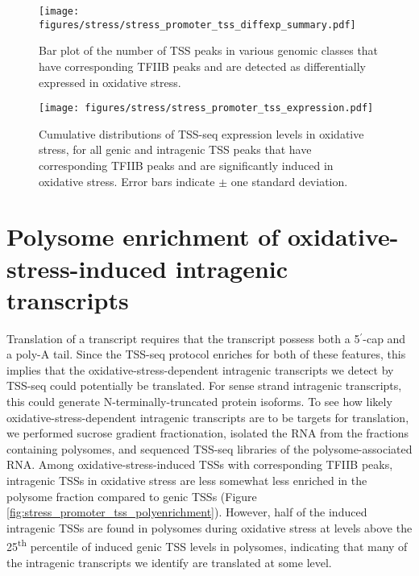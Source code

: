 \begin{SCfigure}[50][h]
    \texttt{[image: figures/stress/stress\_promoter\_tss\_diffexp\_summary.pdf]}
    \caption[Bar plot of the number of promoters in various genomic classes detected as differentially expressed in oxidative stress.]{Bar plot of the number of TSS peaks in various genomic classes that have corresponding TFIIB peaks and are detected as differentially expressed in oxidative stress.}
    \label{fig:stress_promoter_tss_diffexp_summary}
\end{SCfigure}

\begin{figure}[h]
    \texttt{[image: figures/stress/stress\_promoter\_tss\_expression.pdf]}
    \caption[TSS-seq expression levels in oxidative stress of oxidative-stress-induced genic and intragenic promoters.]{Cumulative distributions of TSS-seq expression levels in oxidative stress, for all genic and intragenic TSS peaks that have corresponding TFIIB peaks and are significantly induced in oxidative stress. Error bars indicate $\pm$ one standard deviation.}
    \label{fig:stress_promoter_tss_expression}
\end{figure}

\clearpage

\section{Polysome enrichment of oxidative-stress-induced intragenic transcripts}

Translation of a transcript requires that the transcript possess both a 5$^\prime$-cap and a poly-A tail.
Since the TSS-seq protocol enriches for both of these features, this implies that the oxidative-stress-dependent intragenic transcripts we detect by TSS-seq could potentially be translated.
For sense strand intragenic transcripts, this could generate N-terminally-truncated protein isoforms.
To see how likely oxidative-stress-dependent intragenic transcripts are to be targets for translation, we performed sucrose gradient fractionation, isolated the RNA from the fractions containing polysomes, and sequenced TSS-seq libraries of the polysome-associated RNA.
Among oxidative-stress-induced TSSs with corresponding TFIIB peaks, intragenic TSSs in oxidative stress are less somewhat less enriched in the polysome fraction compared to genic TSSs (Figure \ref{fig:stress_promoter_tss_polyenrichment}).
However, half of the induced intragenic TSSs are found in polysomes during oxidative stress at levels above the 25\textsuperscript{th} percentile of induced genic TSS levels in polysomes, indicating that many of the intragenic transcripts we identify are translated at some level.

